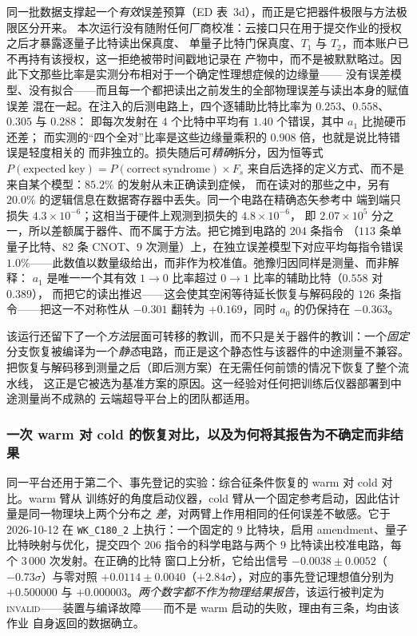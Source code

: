 \documentclass[11pt,a4paper]{article}
\begin{document}
同一批数据支撑起一个\emph{有效}误差预算（ED 表~3d），而正是它把器件极限与方法极限区分开来。
本次运行没有随附任何厂商校准：云接口只在用于提交作业的授权之后才暴露逐量子比特读出保真度、
单量子比特门保真度、$T_1$ 与 $T_2$，而本账户已不再持有该授权，这一拒绝被带时间戳地记录在
产物中，而不是被默默略过。因此下文那些比率是实测分布相对于一个确定性理想症候的边缘量——
没有误差模型、没有拟合——而且每一个都把读出之前发生的全部物理误差与读出本身的赋值误差
混在一起。在注入的后测电路上，四个逐辅助比特比率为 $0.253$、$0.558$、$0.305$ 与 $0.288$：
即每次发射在 $4$ 个比特中平均有 $1.40$ 个错误，其中 $a_1$ 比抛硬币还差；
而实测的“四个全对”比率是这些边缘量乘积的 $0.908$ 倍，也就是说比特错误是轻度相关的
而非独立的。损失随后可\emph{精确}拆分，因为恒等式
$P(\mathrm{expected\ key})=P(\mathrm{correct\ syndrome})\times F_s$
来自后选择的定义方式、而不是来自某个模型：$85.2\%$ 的发射从未正确读到症候，
而在读对的那些之中，另有 $20.0\%$ 的逻辑信息在数据寄存器中丢失。同一个电路在精确态矢参考中
端到端只损失 $4.3\times10^{-6}$；这相当于硬件上观测到损失的 $4.8\times10^{-6}$，
即 $2.07\times10^{5}$ 分之一，所以差额属于器件、而不属于方法。把它摊到电路的 $204$ 条指令
（$113$ 条单量子比特、$82$ 条 CNOT、$9$ 次测量）上，在独立误差模型下对应平均每指令错误
$1.0\%$——此数值以数量级给出，而非作为校准值。弛豫归因同样是测量、而非解释：
$a_1$ 是唯一一个其有效 $1\to0$ 比率超过 $0\to1$ 比率的辅助比特（$0.558$ 对 $0.389$），
而把它的读出推迟——这会使其空闲等待延长恢复与解码段的 $126$ 条指令——把这一不对称性从
$-0.301$ 翻转为 $+0.169$，同时 $a_0$ 的仍保持在 $-0.363$。

该运行还留下了一个\emph{方法}层面可转移的教训，而不只是关于器件的教训：一个\emph{固定}
分支恢复被编译为一个\emph{静态}电路，而正是这个静态性与该器件的中途测量不兼容。
把恢复与解码移到测量之后（即后测方案）在无需任何前馈的情况下恢复了整个流水线，
这正是它被选为基准方案的原因。这一经验对任何把训练后仪器部署到中途测量尚不成熟的
云端超导平台上的团队都适用。

\subsubsection*{一次 warm 对 cold 的恢复对比，以及为何将其报告为不确定而非结果}

同一平台还用于第二个、事先登记的实验：综合征条件恢复的 warm 对 cold 对比。warm 臂从
训练好的角度启动仪器，cold 臂从一个固定参考启动，因此估计量是同一物理块上两个分布之
\emph{差}，对两臂上作用相同的任何误差不敏感。它于 2026-10-12 在 \texttt{WK\_C180\_2}
上执行：一个固定的 $9$ 比特块，启用 amendment、量子比特映射与优化，提交四个
$206$ 指令的科学电路与两个 $9$ 比特读出校准电路，每个 $3\,000$ 次发射。在正确的比特
窗口上分析，它给出信号 $-0.0038\pm0.0052$（$-0.73\sigma$）与零对照
$+0.0114\pm0.0040$（$+2.84\sigma$），对应的事先登记理想值分别为 $+0.500000$ 与
$+0.000003$。\emph{两个数字都不作为物理结果报告}，该运行被判定为
\textsc{invalid}——装置与编译故障——而不是 warm 启动的失败，理由有三条，均由该作业
自身返回的数据确立。
\end{document}
